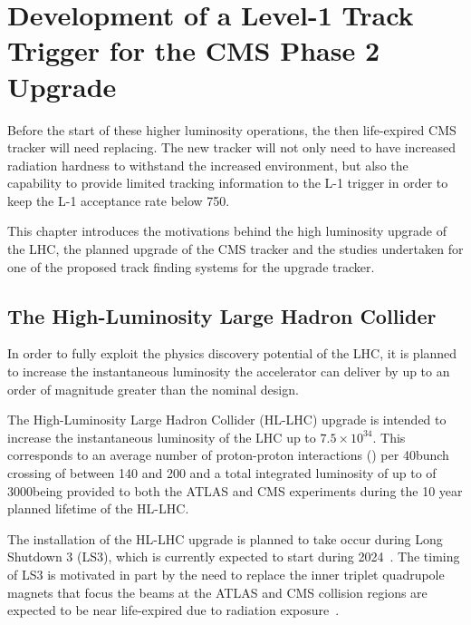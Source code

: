 \chapter{Development of a Level-1 Track Trigger for the CMS Phase 2 Upgrade}\label{chapter:tk-upgrade}
Before the start of these higher luminosity operations, the then life-expired CMS tracker will need replacing.
The new tracker will not only need to have increased radiation hardness to withstand the increased \PU environment, but also the capability to provide limited tracking information to the L-1 trigger in order to keep the L-1 acceptance rate below 750\kHz.

This chapter introduces the motivations behind the high luminosity upgrade of the LHC, the planned upgrade of the CMS tracker and the studies undertaken for one of the proposed track finding systems for the upgrade tracker.

\section{The High-Luminosity Large Hadron Collider} \label{sec:hl-lhc}
In order to fully exploit the physics discovery potential of the LHC, it is planned to increase the instantaneous luminosity the accelerator can deliver by up to an order of magnitude greater than the nominal design.

The High-Luminosity Large Hadron Collider (HL-LHC) upgrade is intended to increase the instantaneous luminosity of the LHC up  to $7.5 \times {10}^{34}$\percms.
This corresponds to an average number of proton-proton interactions (\PU) per 40\MHz bunch crossing of between 140 and 200 and a total integrated luminosity of up to of 3000\fbinv being provided to both the ATLAS and CMS experiments during the 10 year planned lifetime of the HL-LHC.

The installation of the HL-LHC upgrade is planned to take occur during Long Shutdown 3 (LS3), which is currently expected to start during 2024~\cite{ApollinariG.:2017ojx}. 
The timing of LS3 is motivated in part by the need to replace the inner triplet quadrupole magnets that focus the beams at the ATLAS and CMS collision regions are expected to be near life-expired due to radiation exposure~\cite{hl-lhc-prelim-design-report,CMSCollaboration:2015zni}.

